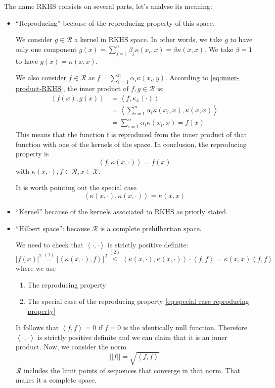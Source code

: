 The name RKHS consists on several parts, let's analyse its meaning:
\begin{itemize}
    \item ``Reproducing'' because of the reproducing property of this space.
    
    We consider $g \in \mathcal{R}$ a kernel in RKHS space. In other words, we take $g$ to have only one component ${g(x)=\sum_{j=1}^n \beta_j \kappa(x_i,x) = \beta \kappa(x,x)}$. We take $\beta=1$ to have $g(x)=\kappa (x,x) $. 
    
    We also consider $f \in \mathcal{R}$ as  $f=\sum_{i=1}^n \alpha_i \kappa(x_i,y)$. According to \autoref{eq:inner-product-RKHS}, the inner product of $f,g \in \mathcal{R}$ is:
    \begin{align}
        \left< f(x), g(x)\right> &= \left< f, \kappa_x(\cdot) \right> \\
        &= \left< \sum_{i=1}^n \alpha_i \kappa(x_i,x) , \kappa (x,x) \right> \\
        &= \sum_{i=1}^n \alpha_i \kappa(x_i,x) = f(x)
    \end{align}
    This means that the function f is reproduced from the inner product of that function with one of the kernels of the space. In conclusion, the reproducing property is $$\left< f, \kappa(x,\cdot)\right> = f(x) $$ with $\kappa(x,\cdot), f \in \mathcal{R}, x \in \mathcal{X}$. 

    It is worth pointing out the special case
    \begin{equation*}\label{eq:special case reproducing property}
        \left< \kappa(x, \cdot), \kappa(x, \cdot) \right> = \kappa(x,x)
    \end{equation*}
    
    \item ``Kernel'' because of the kernels associated to RKHS as priorly stated.
    
    \item ``Hilbert space'': because $\mathcal{R}$ is a complete prehilbertian space. 
    
    We need to check that $\left<\cdot, \cdot\right>$ is strictly positive definite:
    \begin{equation*}
        |f(x)|^2 \stackrel{(1)}{=} |\left< \kappa(x, \cdot), f\right>|^2 \stackrel{(2)}{\leq} \left< \kappa(x, \cdot), \kappa(x, \cdot) \right> \cdot \left< f, f \right> = \kappa(x,x) \left<f, f \right>
    \end{equation*}
    where we use
    \begin{enumerate}
        \item The reproducing property
        \item The special case of the reproducing property \autoref{eq:special case reproducing property}
    \end{enumerate}
    It follows that $\left<f,f\right> = 0$ if $f=0$ is the identically null function. Therefore $\left<\cdot ,\cdot \right>$ is strictly positive definite and we can claim that it is an inner product.
    Now, we consider the norm $$||f|| = \sqrt{\left<f,f\right>}$$ $\mathcal{R}$ includes the limit points of sequences that converge in that norm. That makes it a complete space.
\end{itemize}



